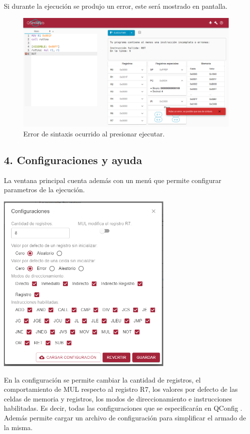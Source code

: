 Si durante la ejecución se produjo un error, este será mostrado en pantalla.
\begin{figure}[H]
  \centering
  \includegraphics[width=14cm]{figuras/error.png}
  \caption{Error de sintaxis ocurrido al presionar ejecutar.}
  \label{fig:error}
\end{figure}

\subsection*{4. Configuraciones y ayuda}
La ventana principal cuenta además con un menú que permite configurar parametros de la ejecución.

\begin{center}
  \includegraphics[width=8.7cm]{figuras/configuraciones.PNG}
\end{center}
En la configuración se permite cambiar la cantidad de registros, el comportamiento de MUL respecto al registro R7, los valores por defecto de las celdas de
memoria y registros, los modos de direccionamiento e instrucciones habilitadas. Es decir, todas las configuraciones que se especificarán en QConfig .
Además permite cargar un archivo de configuración para simplificar el armado de la misma.

